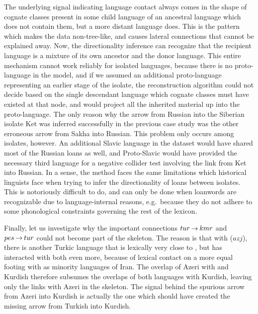 The underlying signal indicating language contact always comes in the shape of cognate classes present in some child language of an ancestral language which does not contain them, but a more distant language does. This is the pattern which makes the data non-tree-like, and causes lateral connections that cannot be explained away. Now, the directionality inference can recognize that the recipient language is a mixture of its own ancestor and the donor language. This entire mechanism cannot work reliably for isolated languages, because there is no proto-language in the model, and if we assumed an additional proto-language representing an earlier stage of the isolate, the reconstruction algorithm could not decide based on the single descendant language which cognate classes must have existed at that node, and would project all the inherited material up into the proto-language. The only reason why the arrow from Russian into the Siberian isolate Ket was inferred successfully in the previous case study was the 
other erroneous arrow from Sakha into Russian. This problem only occurs among isolates, however. An additional Slavic language in the dataset would have shared most of the Russian loans as well, and Proto-Slavic would have provided the necessary third language for a negative collider test involving the link from Ket into Russian. In a sense, the method faces the same limitations which historical linguists face when trying to infer the directionality of loans between isolates. This is notoriously difficult to do, and can only be done when loanwords are recognizable due to language-internal reasons, e.g.\ because they do not adhere to some phonological constraints governing the rest of the lexicon.
 
Finally, let us investigate  why the important connections $tur \kern 2pt\hbox{$\rightarrow$}\kern 2pt kmr$ and $pes\\ \kern 2pt\hbox{$\rightarrow$}\kern 2pt tur$ could not become part of the skeleton. The reason is that with  ($azj$), there is another Turkic language that is lexically very close to , but has interacted with both  even more, because of lexical contact on a more equal footing with  as minority languages of Iran. The overlap of Azeri with  and Kurdish therefore subsumes the overlaps of both languages with Kurdish, leaving only the links with Azeri in the skeleton. The signal behind the spurious arrow from Azeri into Kurdish is actually the one which should have created the missing arrow from Turkish into Kurdish.
 
